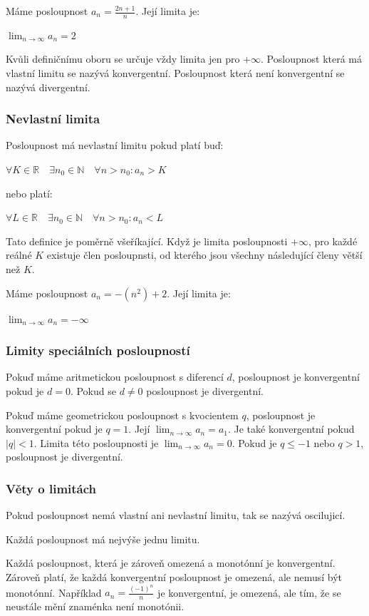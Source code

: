 \documentclass[12pt]{article}
\begin{document}
Máme posloupnost $a_n = \frac{2n + 1}{n}$. Její limita je:

$\lim_{n \to \infty} a_n = 2$

Kvůli definičnímu oboru se určuje vždy limita jen pro $+\infty$.
Posloupnost která má vlastní limitu se nazývá konvergentní. Posloupnost která není konvergentní se
nazývá divergentní.
\subsubsection*{Nevlastní limita}
Posloupnost má nevlastní limitu pokud platí buď:

$\forall K \in \mathbb{R} \quad \exists n_0 \in \mathbb{N} \quad \forall n > n_0 : a_n > K$

nebo platí:

$\forall L \in \mathbb{R} \quad \exists n_0 \in \mathbb{N} \quad \forall n > n_0 : a_n < L$

Tato definice je poměrně všeříkající. Když je limita posloupnosti $+\infty$, pro každé reálné $K$
existuje člen posloupnsti, od kterého jsou všechny následující členy větší než $K$.

Máme posloupnost $a_n = -(n^2) + 2$. Její limita je:

$\lim_{n \to \infty} a_n = -\infty $
\subsubsection*{Limity speciálních posloupností}
Pokuď máme aritmetickou posloupnost s diferencí $d$, posloupnost je konvergentní pokud je $d = 0$.
Pokud se $d \neq 0$ posloupnost je divergentní.

Pokuď máme geometrickou posloupnost s kvocientem $q$, posloupnost je konvergentní pokud je $q = 1$.
Její $\lim_{n \to \infty} a_n = a_1$. Je také konvergentní pokud $|q| < 1$. Limita této posloupnosti
je $\lim_{n \to \infty} a_n = 0$. Pokud je $q \le -1$ nebo $q > 1$, posloupnost je divergentní.
\subsubsection*{Věty o limitách}
Pokud posloupnost nemá vlastní ani nevlastní limitu, tak se nazývá oscilujicí.

Každá posloupnost má nejvýše jednu limitu.

Každá posloupnost, která je zároveň omezená a monotónní je konvergentní. Zároveň platí, že každá
konvergentní posloupnost je omezená, ale nemusí být monotónní. Například $a_n = \frac{(-1)^n}
{n}$ je konvergentní, je omezená, ale tím, že se neustále mění znaménka není monotónii.
\end{document}
